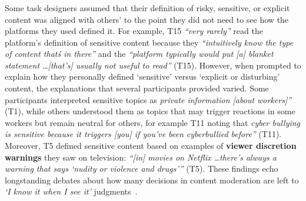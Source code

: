 \subsubsection{}
Some task designers assumed that their definition of risky, sensitive, or explicit content was aligned with others' to the point they did not need to see how the platforms they used defined it. For example, T15 \textit{``very rarely''} read the platform's definition of sensitive content because they \textit{``intuitively know the type of content that\'s in there''} and the \textit{``platform typically would put [a] blanket statement \dots [that's] usually not useful to read''} (T15). However, when prompted to explain how they personally defined `sensitive' versus `explicit or disturbing' content, the explanations that several participants provided varied. Some participants interpreted sensitive topics as \textit{private information [about workers]''} (T1), while others understood them as topics that may trigger reactions in some workers but remain neutral for others, for example T11 noting that \textit{cyber bullying is sensitive because it triggers [you] if you've been cyberbullied before''} (T11). Moreover, T5 defined sensitive content based on examples of \textbf{viewer discretion warnings} they saw on television: \textit{``[in] movies on Netflix \dots there's always a warning that says `nudity or violence and drugs'''} (T5). These findings echo longstanding debates about how many decisions in content moderation are left to \textit{`I know it when I see it'} judgments~\cite{gillespie2020expanding, ohioknow}.

